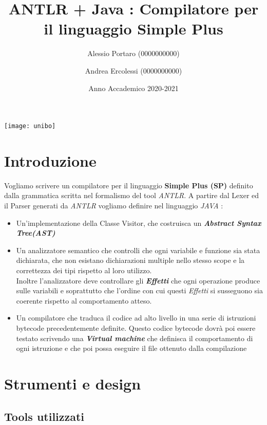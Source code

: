 \documentclass{article}
\title{ANTLR + Java : Compilatore per il linguaggio \textbf{Simple Plus} \vspace{30pt}}
\date{Anno Accademico 2020-2021}
\author[1]{Alessio Portaro (0000000000)}
\author[1]{Andrea Ercolessi (0000000000)}
\affil[1]{Laurea Magistrale in Informatica \\
Alma Mater Studiorum, Campus di Bologna}
\begin{document}
\maketitle
\vspace{25pt}
\begin{centering}
\texttt{[image: unibo]}
\end{centering}
\newpage
\vspace*{\fill}
\tableofcontents
\vspace*{\fill}
\newpage
\section{Introduzione}

Vogliamo scrivere un compilatore per il linguaggio \textbf{Simple Plus (SP)} definito dalla grammatica scritta nel formalismo del tool \textit{ANTLR}. A partire dal Lexer ed il Parser generati da \textit{ANTLR} vogliamo definire nel linguaggio \textit{JAVA} :
\begin{itemize}
    \item Un'implementazione della Classe Visitor, che costruisca un \textbf{\textit{Abstract Syntax Tree(AST)}}
    \item Un analizzatore semantico che controlli che ogni variabile e funzione sia stata dichiarata, che non esistano dichiarazioni multiple nello stesso scope e la correttezza dei tipi rispetto al loro utilizzo. \\ Inoltre l'analizzatore deve controllare gli \textbf{\textit{Effetti}} che ogni operazione produce sulle variabili e soprattutto che l'ordine con cui questi \textit{Effetti} si susseguono sia coerente rispetto al comportamento atteso.
    \item Un compilatore che traduca il codice ad alto livello in una serie di istruzioni bytecode precedentemente definite. Questo codice bytecode dovrà poi essere testato scrivendo una \textbf{\textit{Virtual machine}} che definisca il comportamento di ogni istruzione e che poi possa eseguire il file ottenuto dalla compilazione
\end{itemize}
\newpage
\section{Strumenti e design}

\subsection{Tools utilizzati}
\end{document}
